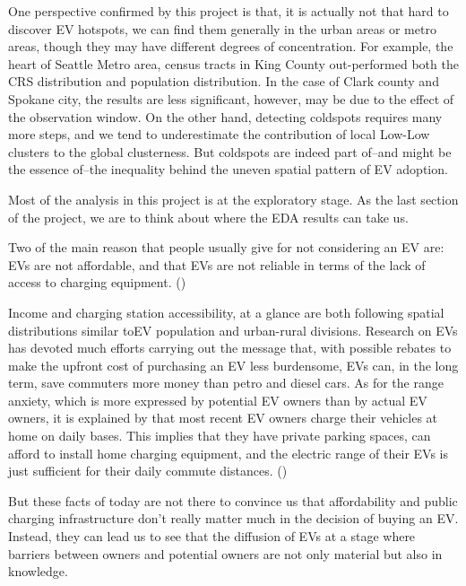 \documentclass[
  letterpaper,
  DIV=11,
  numbers=noendperiod]{scrartcl}
\begin{document}
One perspective confirmed by this project is that, it is actually not
that hard to discover EV hotspots, we can find them generally in the
urban areas or metro areas, though they may have different degrees of
concentration. For example, the heart of Seattle Metro area, census
tracts in King County out-performed both the CRS distribution and
population distribution. In the case of Clark county and Spokane city,
the results are less significant, however, may be due to the effect of
the observation window. On the other hand, detecting coldspots requires
many more steps, and we tend to underestimate the contribution of local
Low-Low clusters to the global clusterness. But coldspots are indeed
part of--and might be the essence of--the inequality behind the uneven
spatial pattern of EV adoption.

Most of the analysis in this project is at the exploratory stage. As the
last section of the project, we are to think about where the EDA results
can take us.

Two of the main reason that people usually give for not considering an
EV are: EVs are not affordable, and that EVs are not reliable in terms
of the lack of access to charging equipment.
()

Income and charging station accessibility, at a glance are both
following spatial distributions similar toEV population and urban-rural
divisions. Research on EVs has devoted much efforts carrying out the
message that, with possible rebates to make the upfront cost of
purchasing an EV less burdensome, EVs can, in the long term, save
commuters more money than petro and diesel cars. As for the range
anxiety, which is more expressed by potential EV owners than by actual
EV owners, it is explained by that most recent EV owners charge their
vehicles at home on daily bases. This implies that they have private
parking spaces, can afford to install home charging equipment, and the
electric range of their EVs is just sufficient for their daily commute
distances. ()

But these facts of today are not there to convince us that affordability
and public charging infrastructure don't really matter much in the
decision of buying an EV. Instead, they can lead us to see that the
diffusion of EVs at a stage where barriers between owners and potential
owners are not only material but also in knowledge.
\end{document}
